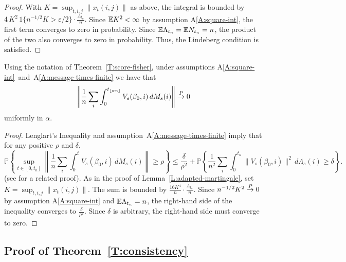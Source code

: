 \documentclass[final]{statsoc}
\begin{document}
\begin{proof}
With $K = \sup_{t,i,j} \| x_t(i,j)\|$ as above, the integral is bounded by
\(
    4 \, K^2 \, 1\{n^{-1/2} K > \varepsilon / 2\}
    \cdot
    \frac{\Lambda_{t_n}}{n}.
\)
Since $\mathbb{E} K^2 < \infty$ by assumption A\ref{A:square-int}, the first term
converges to zero in probability.  Since
$\mathbb{E} \Lambda_{t_n} = \mathbb{E} N_{t_n} = n$, the product of the two also
converges to zero in probability.  Thus, the Lindeberg condition is satisfied.
\end{proof}


\begin{lemma}\label{L:Lenglart}
Using the notation of Theorem~\ref{T:score-fisher}, under assumptions
A\ref{A:square-int}~and~A\ref{A:message-times-finite} we have that
\[
    \left\|
            \frac{1}{n}
            \sum_i
            \int_0^{t_{\lfloor \alpha n \rfloor}}
                V_s(\beta_0, i) \, dM_s(i)
    \right\|
        \overset{\mathit{P}}{\to} 0
\]
uniformly in $\alpha$.
\end{lemma}

\begin{proof}
Lenglart's \citeyearpar{lenglart1977relation} Inequality and assumption~A\ref{A:message-times-finite} imply that
for any positive $\rho$ and $\delta$,
\begin{equation*}
    \mathbb{P}\left\{
        \sup_{t \in [0,t_n]}
        \left\|
            \frac{1}{n}
            \sum_{i}
            \int_{0}^{t}
                V_s(\beta_0, i) \, dM_s(i)
        \right\|
        \geq \rho
    \right\}
    \leq
    \frac{\delta}{\rho^2}
    +
    \mathbb{P}\left\{
        \frac{1}{n^2}
        \sum_{i}
        \int_{0}^{t_n}
            \| V_s (\beta_0, i) \|^2
            \, d\Lambda_s(i)
        \geq
        \delta
    \right\}.
\end{equation*}
(see \citet[Cor.~3.4.1]{fleming1991counting} for a related proof).  As in the proof of
Lemma~\ref{L:adapted-martingale}, set $K = \sup_{t,i,j} \| x_t(i,j) \|$.
The sum is bounded by $\frac{16 K^4}{n} \cdot \frac{\Lambda_{t_n}}{n}$.
Since $n^{-1/2} K^2 \overset{\mathit{P}}{\to} 0$ by assumption A\ref{A:square-int} and
$\mathbb{E} \Lambda_{t_n} = n$, the right-hand side of the inequality converges to
$\frac{\delta}{\rho^2}$.  Since $\delta$ is arbitrary, the right-hand side
must converge to zero.
\end{proof}


\subsection{Proof of Theorem~\ref{T:consistency}}\label{S:proof-consistency}
\end{document}
